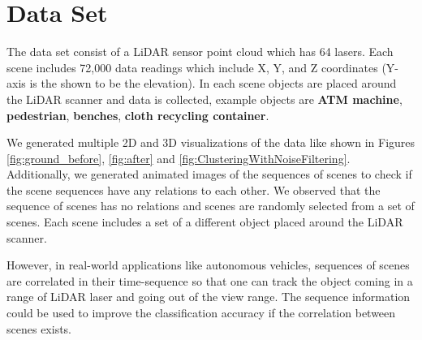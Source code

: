 \section{Data Set}
The data set consist of a LiDAR sensor point cloud which has 64 lasers. Each scene includes 72,000 data readings 
which include X, Y, and Z coordinates (Y-axis is the shown to be the elevation).
In each scene objects are placed around the LiDAR scanner and data is collected, 
example objects are \textbf{ATM machine}, \textbf{pedestrian}, \textbf{benches}, \textbf{cloth recycling container}.

We generated multiple 2D and 3D visualizations of the data like shown in Figures \ref{fig:ground_before},  \ref{fig:after} 
and \ref{fig:ClusteringWithNoiseFiltering}.
Additionally, we generated animated images of the sequences of scenes to check if the scene sequences have any relations to each other.
We observed that the sequence of scenes has no relations and scenes are randomly selected from a set of scenes. Each scene 
includes a set of a different object placed around the LiDAR scanner.  

However, in real-world applications like autonomous vehicles, sequences of scenes are correlated in their time-sequence so that 
one can track the object coming in a range of LiDAR laser and going out of the view range.
The sequence information could be used to improve the classification accuracy if the correlation between scenes exists.



%


